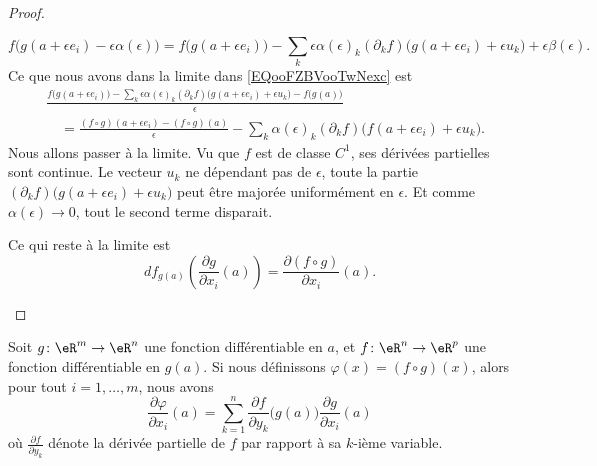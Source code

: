 \begin{proof}
\begin{subproof}
            \begin{equation}
                f\big( g(a+\epsilon e_i)-\epsilon\alpha(\epsilon) \big)=f\big( g(a+\epsilon e_i) \big)-\sum_k\epsilon\alpha(\epsilon)_k(\partial_kf)\big( g(a+\epsilon e_i)+\epsilon u_k \big)+\epsilon\beta(\epsilon).
            \end{equation}
            Ce que nous avons dans la limite dans \eqref{EQooFZBVooTwNexc} est
            \begin{subequations}
                \begin{align}
                    &\frac{ f\big( g(a+\epsilon e_i)\big)-\sum_k\epsilon\alpha(\epsilon)_k (\partial_kf)\big( g(a+\epsilon e_i)+\epsilon u_k \big)-f\big( g(a) \big) }{ \epsilon }\\
                    &\quad=\frac{ (f\circ g)(a+\epsilon e_i)-(f\circ g)(a) }{ \epsilon }
                   -\sum_k\alpha(\epsilon)_k(\partial_kf)\big( f(a+\epsilon e_i)+\epsilon u_k \big).
                \end{align}
            \end{subequations}
            Nous allons passer à la limite. Vu que \( f\) est de classe \( C^1\), ses dérivées partielles sont continue. Le vecteur \( u_k\) ne dépendant pas de \( \epsilon\), toute la partie \( (\partial_kf)\big( g(a+\epsilon e_i)+\epsilon u_k \big)\) peut être majorée uniformément en \( \epsilon\). Et comme \( \alpha(\epsilon)\to 0\), tout le second terme disparait.

            Ce qui reste à la limite est 
            \begin{equation}
                df_{g(a)}\left( \frac{ \partial g }{ \partial x_i }(a) \right)=\frac{ \partial (f\circ g) }{ \partial x_i }(a).
            \end{equation}
    \end{subproof}
\end{proof}


\begin{theorem}	
    Soit $g\colon \eR^m\to \eR^n$ une fonction différentiable en $a$, et $f\colon \eR^n\to \eR^p$ une fonction différentiable en $g(a)$. Si nous définissons $\varphi(x)=(f\circ g)(x)$, alors pour tout $i=1,\ldots,m$, nous avons
	\begin{equation}
		\frac{ \partial \varphi }{ \partial x_i }(a)=\sum_{k=1}^n\frac{ \partial f }{ \partial y_k }\big( g(a) \big)\frac{ \partial g }{ \partial x_i }(a)
	\end{equation}
	où $\frac{ \partial f }{ \partial y_k }$ dénote la dérivée partielle de $f$ par rapport à sa $k$-ième variable.
\end{theorem}

